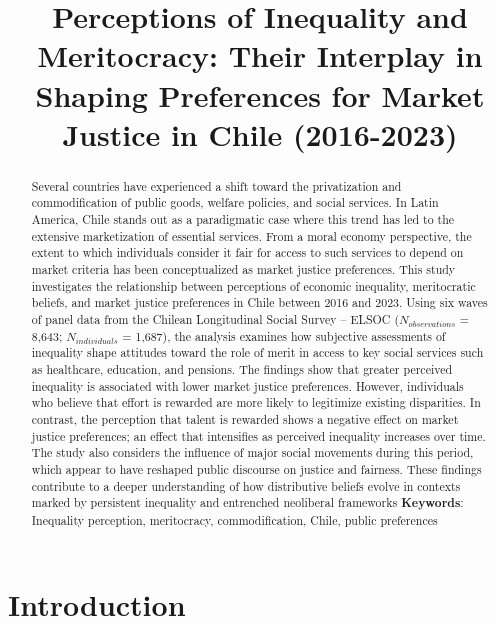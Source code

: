 \documentclass[
  12pt,
]{article}
\title{Perceptions of Inequality and Meritocracy: Their Interplay in
Shaping Preferences for Market Justice in Chile (2016-2023)}
\date{}
\begin{document}
\maketitle
\begin{abstract}
Several countries have experienced a shift toward the privatization and
commodification of public goods, welfare policies, and social services.
In Latin America, Chile stands out as a paradigmatic case where this
trend has led to the extensive marketization of essential services. From
a moral economy perspective, the extent to which individuals consider it
fair for access to such services to depend on market criteria has been
conceptualized as market justice preferences. This study investigates
the relationship between perceptions of economic inequality,
meritocratic beliefs, and market justice preferences in Chile between
2016 and 2023. Using six waves of panel data from the Chilean
Longitudinal Social Survey -- ELSOC (\(N_{observations}\) = 8,643;
\(N_{individuals}\) = 1,687), the analysis examines how subjective
assessments of inequality shape attitudes toward the role of merit in
access to key social services such as healthcare, education, and
pensions. The findings show that greater perceived inequality is
associated with lower market justice preferences. However, individuals
who believe that effort is rewarded are more likely to legitimize
existing disparities. In contrast, the perception that talent is
rewarded shows a negative effect on market justice preferences; an
effect that intensifies as perceived inequality increases over time. The
study also considers the influence of major social movements during this
period, which appear to have reshaped public discourse on justice and
fairness. These findings contribute to a deeper understanding of how
distributive beliefs evolve in contexts marked by persistent inequality
and entrenched neoliberal frameworks \newline \textbf{Keywords}:
Inequality perception, meritocracy, commodification, Chile, public
preferences
\end{abstract}

\section{Introduction}\label{introduction}
\end{document}
